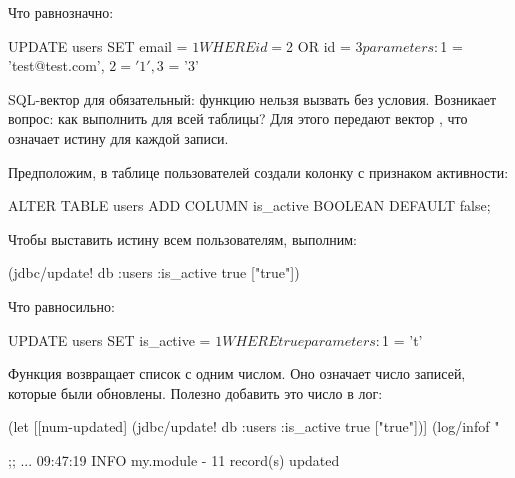 \noindent
Что равнозначно:

\begin{english}
  \begin{sql}
UPDATE users SET email = $1
WHERE id = $2 OR id = $3
parameters:
  $1 = 'test@test.com', $2 = '1', $3 = '3'
  \end{sql}
\end{english}

SQL-вектор для  обязательный: функцию нельзя вызвать без условия. Возникает вопрос: как выполнить  для всей таблицы? Для этого передают вектор \code{["true"]}, что означает истину для каждой записи.

Предположим, в таблице пользователей создали колонку с признаком активности:

\begin{english}
  \begin{sql}
ALTER TABLE users
ADD COLUMN is_active BOOLEAN DEFAULT false;
  \end{sql}
\end{english}

Чтобы выставить истину всем пользователям, выполним:

\begin{english}
  \begin{clojure}
(jdbc/update! db
              :users
              {:is_active true}
              ["true"])
  \end{clojure}
\end{english}

Что равносильно:

\begin{english}
  \begin{sql}
UPDATE users SET is_active = $1 WHERE true
parameters: $1 = 't'
  \end{sql}
\end{english}

Функция  возвращает список с одним числом. Оно означает число записей, которые были обновлены. Полезно добавить это число в лог:

\begin{english}
  \begin{clojure}
(let [[num-updated]
      (jdbc/update! db :users
                    {:is_active true} ["true"])]
  (log/infof "%

;; ... 09:47:19 INFO  my.module - 11 record(s) updated
  \end{clojure}
\end{english}

